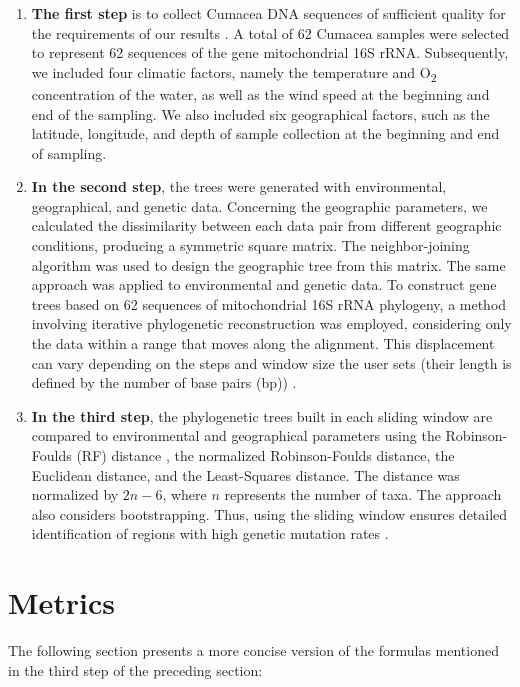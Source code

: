 \begin{enumerate}
\item \textbf{The first step} is to collect Cumacea DNA sequences of sufficient quality for the requirements of our results \citep{koshkarov_phylogeography_2022}. A total of 62 Cumacea samples were selected to represent 62 sequences of the gene mitochondrial 16S rRNA. Subsequently, we included four climatic factors, namely the temperature and O\textsubscript{2} concentration of the water, as well as the wind speed at the beginning and end of the sampling. We also included six geographical factors, such as the latitude, longitude, and depth of sample collection at the beginning and end of sampling.

\item \textbf{In the second step}, the trees were generated with environmental, geographical, and genetic data. Concerning the geographic parameters, we calculated the dissimilarity between each data pair from different geographic conditions, producing a symmetric square matrix. The neighbor-joining algorithm was used to design the geographic tree from this matrix. The same approach was applied to environmental and genetic data. To construct gene trees based on 62 sequences of mitochondrial 16S rRNA phylogeny, a method involving iterative phylogenetic reconstruction was employed, considering only the data within a range that moves along the alignment. This displacement can vary depending on the steps and window size the user sets (their length is defined by the number of base pairs (bp)) \citep{koshkarov_phylogeography_2022}.

\item \textbf{In the third step}, the phylogenetic trees built in each sliding window are compared to environmental and geographical parameters using the Robinson-Foulds (RF) distance \citep{robinson_comparison_1981, koshkarov_phylogeography_2022}, the normalized Robinson-Foulds distance, the Euclidean distance, and the Least-Squares distance. The distance was normalized by $2n-6$, where $n$ represents the number of taxa. The approach also considers bootstrapping. Thus, using the sliding window ensures detailed identification of regions with high genetic mutation rates \citep{koshkarov_phylogeography_2022}.
\end{enumerate}

\section{Metrics}\label{metrics}
The following section presents a more concise version of the formulas mentioned in the third step of the preceding section:

